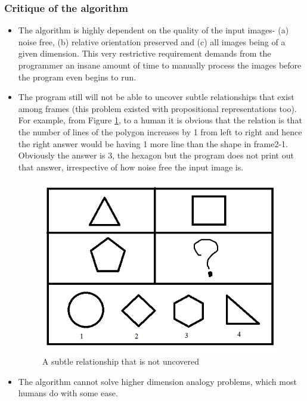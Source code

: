 \documentclass[10pt, letter]{article}
\begin{document}
	\subsubsection*{Critique of the algorithm}
	\begin{itemize}
		\item The algorithm is highly dependent on the quality of the input images- (a) noise free, (b) relative orientation preserved and (c) all images being of a given dimension. This very restrictive requirement demands from the programmer an insane amount of time to manually process the images before the program even begins to run.
		\item The program still will not be able to uncover subtle relationships that exist among frames (this problem existed with propositional representations too). For example, from Figure \ref{con1}, to a human it is obvious that the relation is that the number of lines of the polygon increases by 1 from left to right and hence the right answer would be having 1 more line than the shape in frame2-1.
Obviously the answer is 3, the hexagon but the program does not print out that answer, irrespective of how noise free the input image is.
\begin{figure}[h!]
  \centering
    \includegraphics[scale = 0.3]{Images/con1}
    \caption{A subtle relationship that is not uncovered}
  \label{con1}
\end{figure}
		\item The algorithm cannot solve higher dimension analogy problems, which most humans do with some ease.
	\end{itemize}
\end{document}
